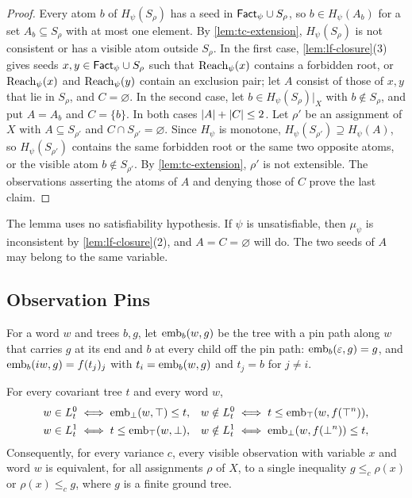 \begin{proof}
Every atom $b$ of $H_\psi(S_\rho)$ has a seed in $\mathsf{Fact}_\psi\cup S_\rho$, so
$b\in H_\psi(A_b)$ for a set $A_b\subseteq S_\rho$ with at most one element. By
\cref{lem:tc-extension}, $H_\psi(S_\rho)$ is not consistent or has a visible
atom outside $S_\rho$. In the first case, \cref{lem:lf-closure}(3) gives
seeds $x,y\in\mathsf{Fact}_\psi\cup S_\rho$ such that $\operatorname{Reach}_\psi(x)$ contains a
forbidden root, or $\operatorname{Reach}_\psi(x)$ and $\operatorname{Reach}_\psi(y)$ contain an exclusion pair;
let $A$ consist of those of $x,y$ that lie in $S_\rho$, and $C=\varnothing$.
In the second case, let $b\in H_\psi(S_\rho)|_X$ with $b\notin S_\rho$, and put
$A=A_b$ and $C=\{b\}$. In both cases $\lvert A\rvert+\lvert C\rvert\le2$. Let $\rho'$ be an
assignment of $X$ with $A\subseteq S_{\rho'}$ and $C\cap
S_{\rho'}=\varnothing$. Since $H_\psi$ is monotone,
$H_\psi(S_{\rho'})\supseteq H_\psi(A)$, so $H_\psi(S_{\rho'})$ contains the
same forbidden root or the same two opposite atoms, or the visible atom
$b\notin S_{\rho'}$. By \cref{lem:tc-extension}, $\rho'$ is not extensible.
The observations asserting the atoms of $A$ and denying those of $C$ prove the
last claim.
\end{proof}

The lemma uses no satisfiability hypothesis. If $\psi$ is unsatisfiable, then
$\mu_\psi$ is inconsistent by \cref{lem:lf-closure}(2), and
$A=C=\varnothing$ will do. The two seeds of $A$ may belong to the same
variable.

\subsection{Observation Pins}\label{sec:tc-pins}

For a word $w$ and trees $b,g$, let $\operatorname{emb}_b(w,g)$ be the tree with a pin path
along $w$ that carries $g$ at its end and $b$ at every child off the pin path:
$\operatorname{emb}_b(\varepsilon,g)=g$, and $\operatorname{emb}_b(iw,g)=f(t_j)_j$ with $t_i=\operatorname{emb}_b(w,g)$ and
$t_j=b$ for $j\ne i$.

\begin{lemma}\label{lem:tc-pins}
For every covariant tree $t$ and every word $w$,
\begin{equation}\label{eq:tc-pins}
\begin{aligned}
 w\in L^0_t&\iff\operatorname{emb}_\bot(w,\top)\le t,&
 w\notin L^0_t&\iff t\le\operatorname{emb}_\top(w,f(\top^n)),\\
 w\in L^1_t&\iff t\le\operatorname{emb}_\top(w,\bot),&
 w\notin L^1_t&\iff\operatorname{emb}_\bot(w,f(\bot^n))\le t,
\end{aligned}
\end{equation}
Consequently, for every variance $c$, every visible observation with variable
$x$ and word $w$ is equivalent, for all assignments $\rho$ of $X$, to a single
inequality $g\le_c\rho(x)$ or $\rho(x)\le_cg$, where $g$ is a finite ground
tree.
\end{lemma}

